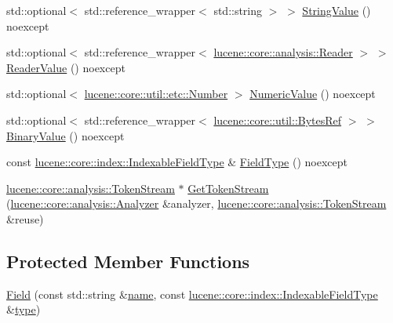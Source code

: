\begin{DoxyCompactItemize}
\item 
std\+::optional$<$ std\+::reference\+\_\+wrapper$<$ std\+::string $>$ $>$ \mbox{\hyperlink{classlucene_1_1core_1_1document_1_1Field_a9eaf712354f0a787e45d4f41b17aeae8}{String\+Value}} () noexcept
\item 
std\+::optional$<$ std\+::reference\+\_\+wrapper$<$ \mbox{\hyperlink{classlucene_1_1core_1_1analysis_1_1Reader}{lucene\+::core\+::analysis\+::\+Reader}} $>$ $>$ \mbox{\hyperlink{classlucene_1_1core_1_1document_1_1Field_a00a928f1bbae6e9d0e6fe1b3af302160}{Reader\+Value}} () noexcept
\item 
std\+::optional$<$ \mbox{\hyperlink{classlucene_1_1core_1_1util_1_1etc_1_1Number}{lucene\+::core\+::util\+::etc\+::\+Number}} $>$ \mbox{\hyperlink{classlucene_1_1core_1_1document_1_1Field_af119306e6d6bf072d815f0f317dd287e}{Numeric\+Value}} () noexcept
\item 
std\+::optional$<$ std\+::reference\+\_\+wrapper$<$ \mbox{\hyperlink{classlucene_1_1core_1_1util_1_1BytesRef}{lucene\+::core\+::util\+::\+Bytes\+Ref}} $>$ $>$ \mbox{\hyperlink{classlucene_1_1core_1_1document_1_1Field_a5415bfa7681238c59d6e0acb2da13bd4}{Binary\+Value}} () noexcept
\item 
const \mbox{\hyperlink{classlucene_1_1core_1_1index_1_1IndexableFieldType}{lucene\+::core\+::index\+::\+Indexable\+Field\+Type}} \& \mbox{\hyperlink{classlucene_1_1core_1_1document_1_1Field_ab6ffe62bb06b157049af54cd2b674007}{Field\+Type}} () noexcept
\item 
\mbox{\hyperlink{classlucene_1_1core_1_1analysis_1_1TokenStream}{lucene\+::core\+::analysis\+::\+Token\+Stream}} $\ast$ \mbox{\hyperlink{classlucene_1_1core_1_1document_1_1Field_aa3d6b7ab7cb42820491c036872190317}{Get\+Token\+Stream}} (\mbox{\hyperlink{classlucene_1_1core_1_1analysis_1_1Analyzer}{lucene\+::core\+::analysis\+::\+Analyzer}} \&analyzer, \mbox{\hyperlink{classlucene_1_1core_1_1analysis_1_1TokenStream}{lucene\+::core\+::analysis\+::\+Token\+Stream}} \&reuse)
\end{DoxyCompactItemize}
\subsection*{Protected Member Functions}
\begin{DoxyCompactItemize}
\item 
\mbox{\hyperlink{classlucene_1_1core_1_1document_1_1Field_ab91735ae2fedab69f837e15ed892ae60}{Field}} (const std\+::string \&\mbox{\hyperlink{classlucene_1_1core_1_1document_1_1Field_a550ee69f8cb7db2a00f3e9bda4964dfb}{name}}, const \mbox{\hyperlink{classlucene_1_1core_1_1index_1_1IndexableFieldType}{lucene\+::core\+::index\+::\+Indexable\+Field\+Type}} \&\mbox{\hyperlink{classlucene_1_1core_1_1document_1_1Field_ad627895c156c58f9bd409caf06edbdf4}{type}})
\end{DoxyCompactItemize}
